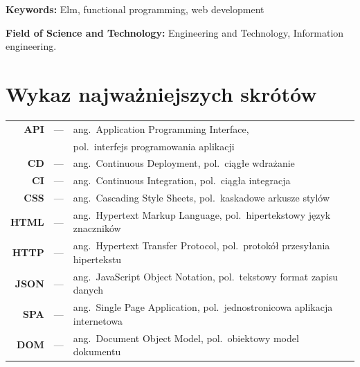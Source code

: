 \documentclass[twoside,a4paper]{report}
\begin{document}
\textbf{Keywords:} Elm, functional programming, web development

\textbf{Field of Science and Technology:} Engineering and Technology, Information engineering.


\tableofcontents


\chapter*{Wykaz najważniejszych skrótów}
\begin{tabular}{rcl}
    \textbf{API} &---& ang.~Application Programming Interface,\\
                 &   & pol.~interfejs programowania aplikacji\\
    \textbf{CD} &---& ang.~Continuous Deployment, pol.~ciągłe wdrażanie\\
    \textbf{CI} &---& ang.~Continuous Integration, pol.~ciągła integracja\\
    \textbf{CSS} &---& ang.~Cascading Style Sheets, pol.~kaskadowe arkusze stylów\\
    \textbf{HTML} &---& ang.~Hypertext Markup Language, pol.~hipertekstowy język znaczników\\
    \textbf{HTTP} &---& ang.~Hypertext Transfer Protocol, pol.~protokół przesyłania hipertekstu\\
    \textbf{JSON} &---& ang.~JavaScript Object Notation, pol.~tekstowy format zapisu danych\\
    \textbf{SPA} &---& ang.~Single Page Application, pol.~jednostronicowa aplikacja internetowa\\
    \textbf{DOM} &---& ang.~Document Object Model, pol.~obiektowy model dokumentu\\
\end{tabular}

\end{document}
